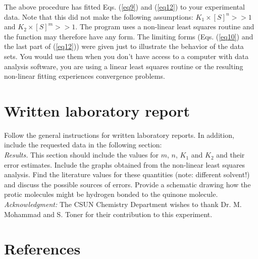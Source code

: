 \documentclass[byrevtex,amssymb,aps,pra,floatfix,letterpaper]{revtex4}
\begin{document}
The above procedure has fitted Eqs. (\ref{eq9}) and (\ref{eq12}) to your experimental data. Note that this did not make the following assumptions: $K_1 \times \left[S\right]^n >> 1$ and $K_2 \times \left[S\right]^m >> 1$. The program uses a non-linear least squares routine and the function may therefore have any form. The limiting forms (Eqs. (\ref{eq10}) and the last part of (\ref{eq12})) were given just to illustrate the behavior of the data sets. You would use them when you don't have access to a computer with data analysis software, you are using a linear least squares routine or the resulting non-linear fitting experiences
convergence problems. 

\section{Written laboratory report}

Follow the general instructions for written laboratory reports. In addition, include the requested data in the following section:\\

\noindent
\textit{Results.} This section should include the values for $m$, $n$, $K_1$ and $K_2$ and their error estimates. Include the graphs obtained from the non-linear least squares analysis. Find the literature values for these quantities \cite{LINSCHITZ} (note: different solvent!) and discuss the possible sources of errors. Provide a schematic drawing how the protic molecules might be hydrogen bonded to the quinone molecule.\\

\noindent
\textit{Acknowledgment:} The CSUN Chemistry Department wishes to thank Dr. M. Mohammad and S. Toner for their contribution to this experiment.

\section{References}

\vspace{-1cm}


\end{document}
